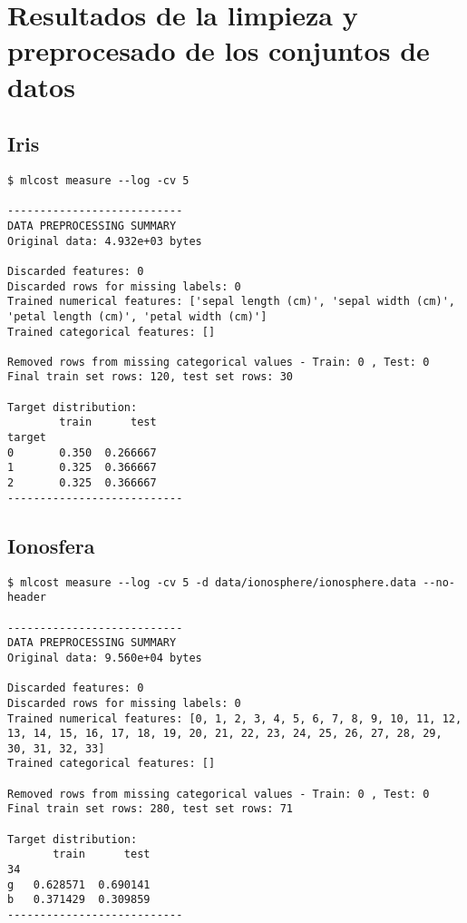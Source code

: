 \section{Resultados de la limpieza y preprocesado de los conjuntos de datos}
\label{app:preprocessing}

\subsection{Iris}
\begin{verbatim}
$ mlcost measure --log -cv 5

---------------------------
DATA PREPROCESSING SUMMARY
Original data: 4.932e+03 bytes

Discarded features: 0
Discarded rows for missing labels: 0
Trained numerical features: ['sepal length (cm)', 'sepal width (cm)', 'petal length (cm)', 'petal width (cm)']
Trained categorical features: []

Removed rows from missing categorical values - Train: 0 , Test: 0
Final train set rows: 120, test set rows: 30

Target distribution:
        train      test
target                 
0       0.350  0.266667
1       0.325  0.366667
2       0.325  0.366667
---------------------------
\end{verbatim}

\subsection{Ionosfera}
\begin{verbatim}
$ mlcost measure --log -cv 5 -d data/ionosphere/ionosphere.data --no-header

---------------------------
DATA PREPROCESSING SUMMARY
Original data: 9.560e+04 bytes

Discarded features: 0
Discarded rows for missing labels: 0
Trained numerical features: [0, 1, 2, 3, 4, 5, 6, 7, 8, 9, 10, 11, 12, 13, 14, 15, 16, 17, 18, 19, 20, 21, 22, 23, 24, 25, 26, 27, 28, 29, 30, 31, 32, 33]
Trained categorical features: []

Removed rows from missing categorical values - Train: 0 , Test: 0
Final train set rows: 280, test set rows: 71

Target distribution:
       train      test
34                    
g   0.628571  0.690141
b   0.371429  0.309859
---------------------------
\end{verbatim}

